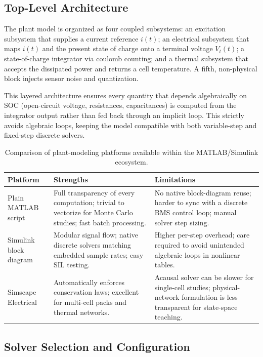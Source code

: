 \subsection{Top-Level Architecture}

The plant model is organized as four coupled subsystems: an excitation subsystem that supplies a current reference $i(t)$; an electrical subsystem that maps $i(t)$ and the present state of charge onto a terminal voltage $V_t(t)$; a state-of-charge integrator via coulomb counting; and a thermal subsystem that accepts the dissipated power and returns a cell temperature. A fifth, non-physical block injects sensor noise and quantization.

This layered architecture ensures every quantity that depends algebraically on SOC (open-circuit voltage, resistances, capacitances) is computed from the integrator output rather than fed back through an implicit loop. This strictly avoids algebraic loops, keeping the model compatible with both variable-step and fixed-step discrete solvers.

\begin{table}[htbp]
\centering
\caption{Comparison of plant-modeling platforms available within the MATLAB/Simulink ecosystem.}
\label{tab:10_platforms}
\renewcommand{\arraystretch}{1.3} %
\begin{tabularx}{\textwidth}{@{}l X X@{}}
\toprule
\textbf{Platform} & \textbf{Strengths} & \textbf{Limitations} \\
\midrule
Plain MATLAB script & Full transparency of every computation; trivial to vectorize for Monte Carlo studies; fast batch processing. & No native block-diagram reuse; harder to sync with a discrete BMS control loop; manual solver step sizing. \\
Simulink block diagram & Modular signal flow; native discrete solvers matching embedded sample rates; easy SIL testing. & Higher per-step overhead; care required to avoid unintended algebraic loops in nonlinear tables. \\
Simscape Electrical & Automatically enforces conservation laws; excellent for multi-cell packs and thermal networks. & Acausal solver can be slower for single-cell studies; physical-network formulation is less transparent for state-space teaching. \\
\bottomrule
\end{tabularx}
\end{table}

\subsection{Solver Selection and Configuration}

